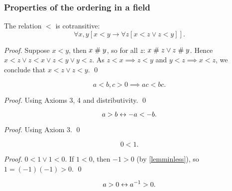 \subsubsection{Properties of the ordering in a field}

\begin{lemma}[$<$ is cotransitive]\label{lemlesscotr}
The relation $<$ is cotransitive:
$$\forall x,y [x<y \rightarrow\forall z[x<z \vee z< y]].$$
\end{lemma}

\begin{proof}
Suppose $x < y$, then $x\mathrel{\#} y$, so for all $z$: $x\mathrel{\#} z \vee
z\mathrel{\#} y$. Hence $x< z \vee z < x \vee z < y \vee y < z$. As $ z<x
\implies z<y$ and $y<z \implies x<z$, we conclude that $x < z \vee z <
y$. \qed
\end{proof}

\weg{
\begin{lemma}[Cancellation fo $<$]]\label{lemcanclt}
$$x+y <y+z \implies x<y.$$
\end{lemma}

\begin{proof} Immediate from Axiom 2. \qed
\end{proof}
}

\begin{lemma}[$*$ respects $<$]\label{lempres1}
$$a < b, c >0 \implies a   c < b   c.$$
\end{lemma}

\begin{proof} Using Axioms 3, 4 and distributivity. \qed
\end{proof}
 
\begin{lemma}\label{lemminless}
$$a>b \leftrightarrow -a < -b.$$
\end{lemma}

\begin{proof}
Using Axiom 3. \qed 
\end{proof}

\begin{corollary}
$$0 < 1.$$
\end{corollary}

\begin{proof}
$0<1\vee 1<0$. If $1<0$, then $-1 > 0$ (by \ref{lemminless}), so $1 = (-1)
 (-1) > 0$. \qed
\end{proof}

\begin{lemma}\label{leminvpos}
$$a> 0 \leftrightarrow a^{-1} > 0.$$
\end{lemma}

